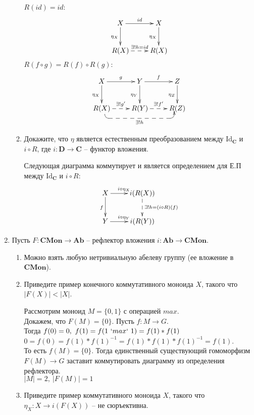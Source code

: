 \documentclass[draft]{article}
\newcommand{\cat}[1]{\mathbf{#1}}
\renewcommand{\C}{\cat{C}}
\newcommand{\D}{\cat{D}}
\newcommand{\CMon}{\cat{CMon}}
\newcommand{\Ab}{\cat{Ab}}
\newcommand{\fs}[1]{\mathrm{#1}}
\begin{document}
\begin{enumerate}
\begin{enumerate}
$R(id) = id:$
\[
\xymatrix{
X \ar[r]^{id} \ar[d]_{\eta_X} & X \ar[d]_{\eta_X} \\
R(X) \ar@{-->}[r]^{\exists! h = id} & R(X)
}
\]
$R(f\circ g) = R(f) \circ R(g):$
\[
\xymatrix{
X \ar[r]^g \ar[d]_{\eta_X} & Y\ar[r]^f \ar[d]_{\eta_Y} & Z \ar[d]_{\eta_Z}\\
R(X) \ar@{-->}[r]^{\exists!g'} 
\ar@<1ex>@{-->}`d/10pt`[rr]_{\exists!h}
& R(Y) \ar@{-->}[r]^{\exists!f'} & R(Z)
}
\]

\item Докажите, что $\eta$ является естественным преобразованием между $\fs{Id}_\C$ и $i \circ R$, где $i : \D \to \C$ -- функтор вложения.

Следующая диаграмма коммутирует и является определением для Е.П между $\fs{Id}_\C$ и $i \circ R$:
\[
\xymatrix{
X \ar[r]^{i \circ \eta_X} \ar[d]_{f} & i(R(X)) \ar@{-->}[d]^{\exists!h =(i \circ R)(f)} \\
Y \ar[r]^{i \circ \eta_Y} &  i(R(Y))
}
\]
\end{enumerate}

\item Пусть $F : \CMon \to \Ab$ -- рефлектор вложения $i : \Ab \to \CMon$.
\begin{enumerate}
\item {}

Можно взять любую нетривиальную абелеву группу (ее вложение в $\CMon$).
\item Приведите пример конечного коммутативного моноида $X$, такого что $|F(X)| < |X|$.

Рассмотрим моноид $M = \{0, 1\}$ с операцией $max$.\\
Докажем, что $F(M) = \{0\}$. Пусть $f : M \to G$. \\
Тогда $f(0) = 0,~f(1) = f(1 ~`max`~ 1) = f(1)\ast f(1)$\\
$0 = f(0) = f(1) \ast f(1)^{-1} = f(1) \ast  f(1) \ast f(1)^{-1} = f(1)$. \\
То есть $f(M) = \{0\}$. Тогда единственный существующий гомоморфизм $F(M) \to G$ заставит коммутировать диаграмму из определения рефлектора.\\

$|M| = 2, ~|F(M)| = 1$


\item Приведите пример коммутативного моноида $X$, такого что $\eta_X : X \to i(F(X))$ -- не сюръективна.\\


\end{enumerate}
\end{enumerate}
\end{document}
